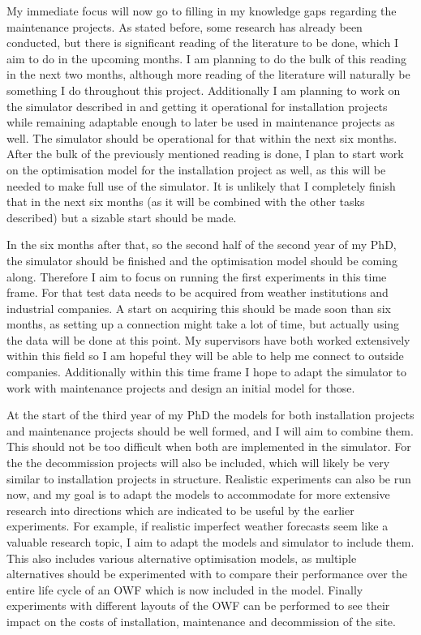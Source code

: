\documentclass[a4paper,12pt]{article}
\begin{document}
\bigskip

My immediate focus will now go to filling in my knowledge gaps regarding the maintenance projects. As stated before, some research has already been conducted, but there is significant reading of the literature to be done, which I aim to do in the upcoming months. I am planning to do the bulk of this reading in the next two months, although more reading of the literature will naturally be something I do throughout this project. Additionally I am planning to work on the simulator described in  and getting it operational for installation projects while remaining adaptable enough to later be used in maintenance projects as well. The simulator should be operational for that within the next six months. After the bulk of the previously mentioned reading is done, I plan to start work on the optimisation model for the installation project as well, as this will be needed to make full use of the simulator. It is unlikely that I completely finish that in the next six months (as it will be combined with the other tasks described) but a sizable start should be made. 

In the six months after that, so the second half of the second year of my PhD, the simulator should be finished and the optimisation model should be coming along. Therefore I aim to focus on running the first experiments in this time frame. For that test data needs to be acquired from weather institutions and industrial companies. A start on acquiring this should be made soon than six months, as setting up a connection might take a lot of time, but actually using the data will be done at this point. My supervisors have both worked extensively within this field so I am hopeful they will be able to help me connect to outside companies. Additionally within this time frame I hope to adapt the simulator to work with maintenance projects and design an initial model for those.

\bigskip

At the start of the third year of my PhD the models for both installation projects and maintenance projects should be well formed, and I will aim to combine them. This should not be too difficult when both are implemented in the simulator. For the the decommission projects will also be included, which will likely be very similar to installation projects in structure. Realistic experiments can also be run now, and my goal is to adapt the models to accommodate for more extensive research into directions which are indicated to be useful by the earlier experiments. For example, if realistic imperfect weather forecasts seem like a valuable research topic, I aim to adapt the models and simulator to include them. This also includes various alternative optimisation models, as multiple alternatives should be experimented with to compare their performance over the entire life cycle of an OWF which is now included in the model. Finally experiments with different layouts of the OWF can be performed to see their impact on the costs of installation, maintenance and decommission of the site. 
\end{document}
